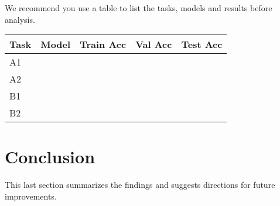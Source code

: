 \documentclass{article}
\begin{document}
    We recommend you use a table to list the tasks, models and results before analysis.
    

    \begin{table}[]
    \label{table:Table1}
    \begin{tabular}{@{}lllll@{}}
    \toprule
    Task & Model & Train Acc & Val Acc & Test Acc \\ \midrule
    A1   &       &           &         &          \\
    A2   &       &           &         &          \\
    B1   &       &           &         &          \\
    B2   &       &           &         &          \\ \bottomrule
    \end{tabular}
    \end{table}

\section{Conclusion}
\label{sec:conclusion}
    This last section summarizes the findings and suggests directions for future improvements.

\vfill\pagebreak

\printbibliography
% 
% 

\newpage
\appendix
\appendixpage
\end{document}
